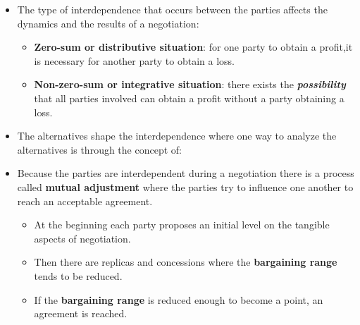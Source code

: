 \documentclass[
  ignorenonframetext,
]{beamer}
\providecommand{\tightlist}{%
  \setlength{\itemsep}{0pt}\setlength{\parskip}{0pt}}\usepackage{longtable,booktabs,array}
\begin{document}
\begin{frame}{}
\label{section-3}
\begin{itemize}
\item
  The type of interdependence that occurs between the parties affects
  the dynamics and the results of a negotiation:

  \begin{itemize}
  \item
    \textbf{Zero-sum or distributive situation}: for one party to obtain
    a profit,it is necessary for another party to obtain a loss.
  \item
    \textbf{Non-zero-sum or integrative situation}: there exists the
    \textbf{\emph{possibility}} that all parties involved can obtain a
    profit without a party obtaining a loss.
  \end{itemize}
\item
  The alternatives shape the interdependence where one way to analyze
  the alternatives is through the concept of:

\end{itemize}
\end{frame}

\begin{frame}{}
\label{section-4}
\begin{itemize}
\item
  Because the parties are interdependent during a negotiation there is a
  process called \textbf{mutual adjustment} where the parties try to
  influence one another to reach an acceptable agreement.

  \begin{itemize}
  \item
    At the beginning each party proposes an initial level on the
    tangible aspects of negotiation.
  \item
    Then there are replicas and concessions where the \textbf{bargaining
    range} tends to be reduced.
  \item
    If the \textbf{bargaining range} is reduced enough to become a
    point, an agreement is reached.
  \end{itemize}
\end{itemize}
\end{frame}
\end{document}
